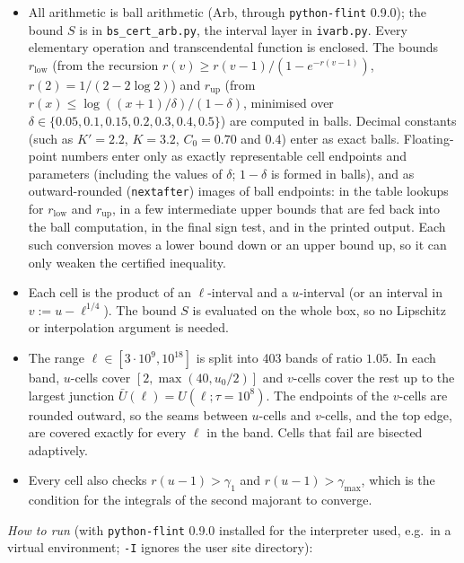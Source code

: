\begin{itemize}
\item All arithmetic is ball arithmetic (Arb, through \texttt{python-flint} 0.9.0); the bound $S$ is in \texttt{bs\_cert\_arb.py},
the interval layer in \texttt{ivarb.py}. Every elementary
operation and transcendental function is enclosed. The bounds $r_{\mathrm{low}}$ (from the recursion
$r(v)\ge r(v-1)/(1-e^{-r(v-1)})$, $r(2)=1/(2-2\log2)$) and $r_{\mathrm{up}}$ (from $r(x)\le\log((x+1)/\delta)/(1-\delta)$, minimised
over $\delta\in\{0.05,0.1,0.15,0.2,0.3,0.4,0.5\}$) are computed in balls. Decimal constants (such as $K'=2.2$, $K=3.2$,
$C_0=0.70$ and $0.4$) enter as exact balls. Floating-point numbers enter only as exactly representable cell endpoints and
parameters (including the values of $\delta$; $1-\delta$ is formed in balls), and as
outward-rounded (\texttt{nextafter}) images of ball endpoints: in the table lookups for $r_{\mathrm{low}}$ and $r_{\mathrm{up}}$, in a
few intermediate upper bounds that are fed back into the ball computation, in the final sign test, and in the printed output. Each
such conversion moves a lower bound down or an upper bound up, so it can only weaken the certified inequality.
\item Each cell is the product of an $\ell$-interval and a $u$-interval (or an interval in $v:=u-\ell^{1/4}$). The bound $S$ is
evaluated on the whole box, so no Lipschitz or interpolation argument is needed.
\item The range $\ell\in[3\cdot10^9,10^{18}]$ is split into 403 bands of ratio $1.05$. In each band, $u$-cells cover
$[2,\max(40,u_0/2)]$ and $v$-cells cover the rest up to the largest junction $\bar U(\ell)=U(\ell;\tau=10^8)$. The endpoints of the
$v$-cells are rounded outward, so the seams between $u$-cells and $v$-cells, and the top edge, are covered exactly for every $\ell$ in
the band. Cells that fail are bisected adaptively.
\item Every cell also checks $r(u-1)>\gamma_1$ and $r(u-1)>\gamma_{\max}$, which is the condition for the integrals of the second
majorant to converge.
\end{itemize}
\emph{How to run} (with \texttt{python-flint} 0.9.0 installed for the interpreter used, e.g.\ in a virtual environment;
\texttt{-I} ignores the user site directory):
\begingroup\footnotesize
